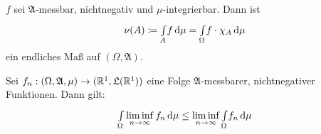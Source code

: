 \documentclass{cheat-sheet}
\newcommand{\Alg}{\mathfrak{A}}
\newcommand{\LebAlg}{\mathfrak{L}} %
\newcommand{\IntOmu}[1]{\Int{\Omega}{}{#1}{\mu}} %
\begin{document}
\begin{satz}
  $f$ sei $\Alg$-messbar, nichtnegativ und $\mu$-integrierbar. Dann ist
  \[ \nu(A) \coloneqq \Int{A}{}{f}{\mu} = \IntOmu{f \cdot \chi_A} \]
  ein endliches Maß auf $(\Omega, \Alg)$.
\end{satz}

\begin{satz}
  Sei $f_n : (\Omega, \Alg, \mu) \to (\R^1, \LebAlg(\R^1))$ eine Folge $\Alg$-messbarer, nichtnegativer Funktionen. Dann gilt:
  \[ \IntOmu{\liminf_{n \to \infty} f_n} \leq \liminf_{n \to \infty} \IntOmu{f_n} \]
\end{satz}
\end{document}
